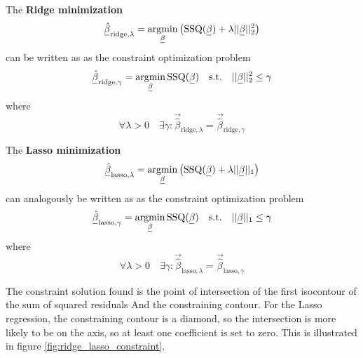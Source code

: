 The \textbf{Ridge minimization}
\begin{equation}
    \vec{\hat{\beta}}_{\text{ridge},\lambda} = \argmin_{\vec{\beta}} \left( \operatorname{SSQ}( \vec{\beta}) + \lambda || \vec{\beta} ||_2^2 \right)
\end{equation}
can be written as as the constraint optimization problem
\begin{equation}
    \vec{\hat{\beta}}_{\text{ridge},\gamma} = \argmin_{\vec{\beta}} \operatorname{SSQ}(\vec{\beta}) \quad \text{s.t.} \quad || \vec{\beta} ||_2^2 \leq \gamma
\end{equation}
where
\begin{equation}
    \forall \lambda > 0 \quad \exists \gamma: \vec{\hat{\beta}}_{\text{ridge},\lambda} = \vec{\hat{\beta}}_{\text{ridge},\gamma}
\end{equation}

The \textbf{Lasso minimization}
\begin{equation}
    \vec{\hat{\beta}}_{\text{lasso},\lambda} = \argmin_{\vec{\beta}} \left( \operatorname{SSQ}( \vec{\beta}) + \lambda || \vec{\beta} ||_1 \right)
\end{equation}
can analogously be written as as the constraint optimization problem
\begin{equation}
    \vec{\hat{\beta}}_{\text{lasso},\gamma} = \argmin_{\vec{\beta}} \operatorname{SSQ}(\vec{\beta}) \quad \text{s.t.} \quad || \vec{\beta} ||_1 \leq \gamma
\end{equation}
where
\begin{equation}
    \forall \lambda > 0 \quad \exists \gamma: \vec{\hat{\beta}}_{\text{lasso},\lambda} = \vec{\hat{\beta}}_{\text{lasso},\gamma}
\end{equation}


The constraint solution found is the point of intersection of the first isocontour of the sum of squared residuals And
the constraining contour. For the Lasso regression, the constraining contour is a diamond, so the intersection
is more likely to be on the axis, so at least one coefficient is set to zero. This is illustrated in figure \ref{fig:ridge_lasso_constraint}.

